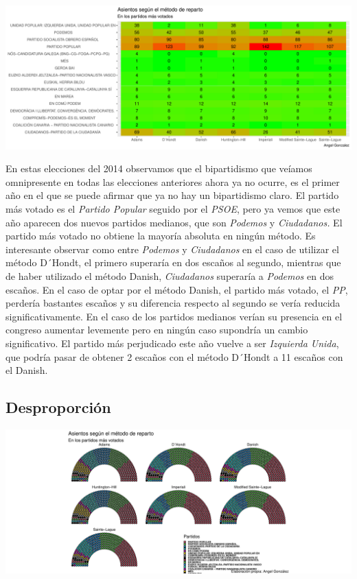 \documentclass[12pt,a4paper,]{book}
\numberwithin{dummy}{section}
\theoremstyle{ocrenumbox}
\theoremstyle{blacknumex}
\theoremstyle{blacknumbox}
\theoremstyle{ocrenum}
\theoremstyle{ocrenum}
\begin{document}
\begin{center}\includegraphics[width=1\linewidth]{figurasR/unnamed-chunk-109-2} \end{center}

En estas elecciones del 2014 observamos que el bipartidismo que veíamos
omnipresente en todas las elecciones anteriores ahora ya no ocurre, es
el primer año en el que se puede afirmar que ya no hay un bipartidismo
claro. El partido más votado es el \emph{Partido Popular} seguido por el
\emph{PSOE}, pero ya vemos que este año aparecen dos nuevos partidos
medianos, que son \emph{Podemos} y \emph{Ciudadanos.} El partido más
votado no obtiene la mayoría absoluta en ningún método. Es interesante
observar como entre \emph{Podemos} y \emph{Ciudadanos} en el caso de
utilizar el método D´Hondt, el primero superaría en dos escaños al
segundo, mientras que de haber utilizado el método Danish,
\emph{Ciudadanos} superaría a \emph{Podemos} en dos escaños. En el caso
de optar por el método Danish, el partido más votado, el \emph{PP},
perdería bastantes escaños y su diferencia respecto al segundo se vería
reducida significativamente. En el caso de los partidos medianos verían
su presencia en el congreso aumentar levemente pero en ningún caso
supondría un cambio significativo. El partido más perjudicado este año
vuelve a ser \emph{Izquierda Unida}, que podría pasar de obtener 2
escaños con el método D´Hondt a 11 escaños con el Danish.

\hypertarget{desproporciuxf3n-11}{%
\subsection{Desproporción}\label{desproporciuxf3n-11}}

\begin{center}\includegraphics[width=1\linewidth]{figurasR/unnamed-chunk-110-1} \end{center}
\end{document}
